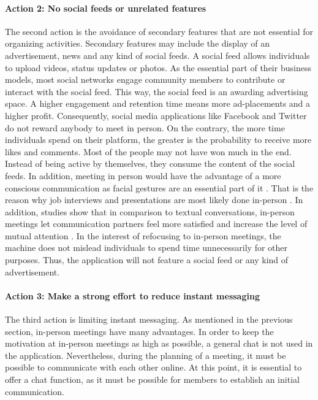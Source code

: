 \documentclass[12pt,numbers=noenddot,parskip,bibliography=totocnumbered,listof=totocnumbered,draft=true]{scrreprt}
\begin{document}
\paragraph{Action 2: No social feeds or unrelated features}
The second action is the avoidance of secondary features that are not essential for organizing activities. Secondary features may include the display of an advertisement, news and any kind of social feeds. A social feed allows individuals to upload videos, status updates or photos. As the essential part of their business models, most social networks engage community members to contribute or interact with the social feed. This way, the social feed is an awarding advertising space. A higher engagement and retention time means more ad-placements and a higher profit. Consequently, social media applications like Facebook and Twitter do not reward anybody to meet in person. On the contrary, the more time individuals spend on their platform, the greater is the probability to receive more likes and comments. Most of the people may not have won much in the end. Instead of being active by themselves, they consume the content of the social feeds. In addition, meeting in person would have the advantage of a more conscious communication as facial gestures are an essential part of it  \citep{vanderkam2017}. That is the reason why job interviews and presentations are most likely done in-person \citep{vanderkam2017}. In addition, studies show that in comparison to textual conversations, in-person meetings let communication partners feel more satisfied and increase the level of mutual attention \citep{vanderkam2017}. \newline
In the interest of refocusing to in-person meetings, the machine does not mislead individuals to spend time unnecessarily for other purposes. Thus, the application will not feature a social feed or any kind of advertisement.

\paragraph{Action 3: Make a strong effort to reduce instant messaging}
The third action is limiting instant messaging. As mentioned in the previous section, in-person meetings have many advantages. In order to keep the motivation at in-person meetings as high as possible, a general chat is not used in the application. Nevertheless, during the planning of a meeting, it must be possible to communicate with each other online. At this point, it is essential to offer a chat function, as it must be possible for members to establish an initial communication.
\end{document}
